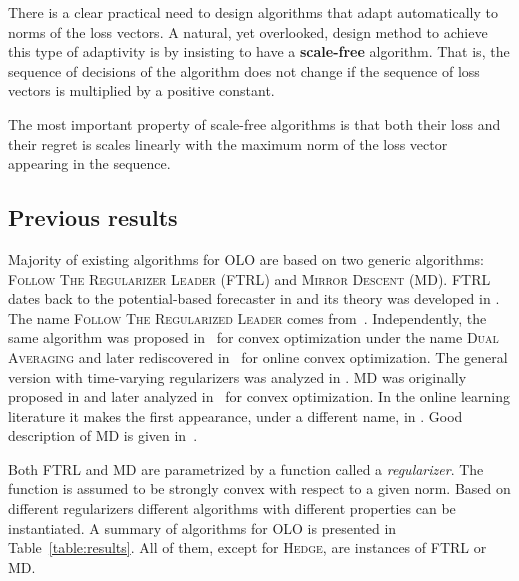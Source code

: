 
There is a clear practical need to design algorithms that adapt automatically
to norms of the loss vectors.  A natural, yet overlooked, design method to
achieve this type of adaptivity is by insisting to have a \textbf{scale-free}
algorithm.  That is, the sequence of decisions of the algorithm does not change
if the sequence of loss vectors is multiplied by a positive constant.

The most important property of scale-free algorithms is that both their loss
and their regret is scales linearly with the maximum norm of the loss vector
appearing in the sequence.

\subsection{Previous results}

Majority of existing algorithms for OLO are based on two generic algorithms:
\textsc{Follow The Regularizer Leader} (\textsc{FTRL}) and \textsc{Mirror
Descent} (\textsc{MD}). \textsc{FTRL} dates back to the potential-based
forecaster in \cite[Chapters~11]{Cesa-Bianchi-Lugosi-2006} and its theory was
developed in \cite{Shalev-Shwartz-2007}.  The name \textsc{Follow The
Regularized Leader} comes from~\cite{Abernethy-Hazan-Rakhlin-2008}.
Independently, the same algorithm was proposed in~\cite{Nestorov-2009} for
convex optimization under the name \textsc{Dual Averaging} and later
rediscovered in~\cite{Xiao-2010} for online convex optimization. The general
version with time-varying regularizers was analyzed in
\cite{Orabona-Crammer-Cesa-Bianchi-2014}. \textsc{MD} was originally proposed
in \cite{Nemirovski-Yudin-1983} and later analyzed in~\cite{Beck-Teboulle-2003}
for convex optimization. In the online learning literature it makes the first
appearance, under a different name, in \cite{Kivinen-Warmuth-1997}. Good
description of \textsc{MD} is given in~\cite{Rakhlin-Sridharan-2009}.

Both \textsc{FTRL} and \textsc{MD} are parametrized by a function called a
\emph{regularizer}. The function is assumed to be strongly convex with respect
to a given norm. Based on different regularizers different algorithms with
different properties can be instantiated. A summary of algorithms for OLO is
presented in Table~\ref{table:results}.  All of them, except for
\textsc{Hedge}, are instances of \textsc{FTRL} or \textsc{MD}.

